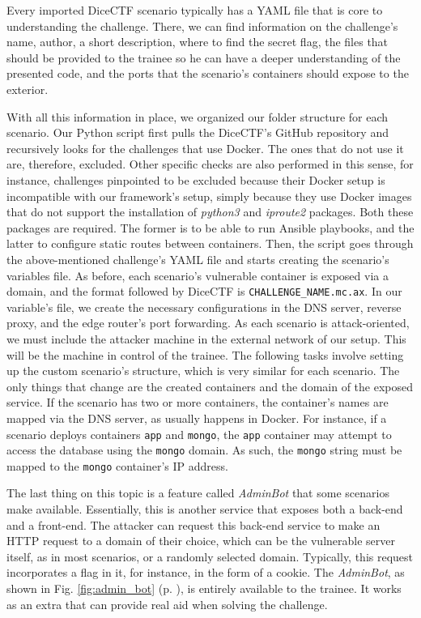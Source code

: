 Every imported DiceCTF scenario typically has a YAML file that is core to understanding the challenge. There, we can find information on the challenge's name, author, a short description, where to find the secret flag, the files that should be provided to the trainee so he can have a deeper understanding of the presented code, and the ports that the scenario's containers should expose to the exterior.

With all this information in place, we organized our folder structure for each scenario. Our Python script first pulls the DiceCTF's GitHub repository and recursively looks for the challenges that use Docker. The ones that do not use it are, therefore, excluded. Other specific checks are also performed in this sense, for instance, challenges pinpointed to be excluded because their Docker setup is incompatible with our framework's setup, simply because they use Docker images that do not support the installation of \textit{python3} and \textit{iproute2} packages. Both these packages are required. The former is to be able to run Ansible playbooks, and the latter to configure static routes between containers.
Then, the script goes through the above-mentioned challenge's YAML file and starts creating the scenario's variables file. As before, each scenario's vulnerable container is exposed via a domain, and the format followed by DiceCTF is \texttt{{CHALLENGE\_NAME}.mc.ax}. In our variable's file, we create the necessary configurations in the DNS server, reverse proxy, and the edge router's port forwarding. As each scenario is attack-oriented, we must include the attacker machine in the external network of our setup. This will be the machine in control of the trainee. The following tasks involve setting up the custom scenario's structure, which is very similar for each scenario. The only things that change are the created containers and the domain of the exposed service. If the scenario has two or more containers, the container's names are mapped via the DNS server, as usually happens in Docker. For instance, if a scenario deploys containers \texttt{app} and \texttt{mongo}, the \texttt{app} container may attempt to access the database using the \texttt{mongo} domain. As such, the \texttt{mongo} string must be mapped to the \texttt{mongo} container's IP address.

The last thing on this topic is a feature called \textit{AdminBot} that some scenarios make available. Essentially, this is another service that exposes both a back-end and a front-end. The attacker can request this back-end service to make an HTTP request to a domain of their choice, which can be the vulnerable server itself, as in most scenarios, or a randomly selected domain. Typically, this request incorporates a flag in it, for instance, in the form of a cookie. The \textit{AdminBot}, as shown in Fig. \ref{fig:admin_bot} (p. \pageref{fig:admin_bot}), is entirely available to the trainee. It works as an extra that can provide real aid when solving the challenge.

